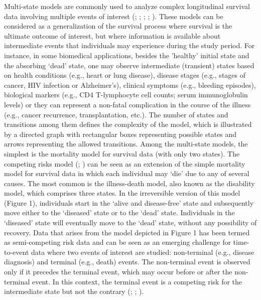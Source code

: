 Multi-state models are commonly used to analyze complex longitudinal survival data involving multiple events of interest (\citealp{Andersen1993}; \citealp{Hougaard2000}; \citealp{Putter2007}; \citealp{MM2009}; \citealp{LFMM2019}). These models can be considered as a generalization of the survival process where survival is the ultimate outcome of interest, but where information is available about intermediate events that individuals may experience during the study period. For instance, in some biomedical applications, besides the 'healthy' initial state and the absorbing `dead' state, one may observe intermediate (transient) states based on health conditions (e.g., heart or lung disease), disease stages (e.g., stages of cancer, HIV infection or Alzheimer's), clinical symptoms (e.g., bleeding episodes), biological markers (e.g., CD4 T-lymphocyte cell counts; serum immunoglobulin levels) or they can represent a non-fatal complication in the course of the illness (e.g., cancer recurrence, transplantation, etc.). The number of states and transitions among them defines the complexity of the model, which is illustrated by a directed graph with rectangular boxes representing possible states and arrows representing the allowed transitions. Among the multi-state models, the simplest is the mortality model for survival data (with only two states). The competing risks model (\citealp{Andersen2002}; \citealp{Putter2007}) can be seen as an extension of the simple mortality model for survival data in which each individual may `die' due to any of several causes. The most common is the illness-death model, also known as the disability model, which comprises three states. In the irreversible version of this model (Figure 1), individuals start in the `alive and disease-free' state and subsequently move either to the `diseased' state or to the `dead' state. Individuals in the `diseased' state will eventually move to the `dead' state, without any possibility of recovery. Data that arises from the model depicted in Figure 1 has been termed as semi-competing risk data and can be seen as an emerging challenge for time-to-event data where two events of interest are studied: non-terminal (e.g., disease diagnosis) and terminal (e.g., death) events. The non-terminal event is observed only if it precedes the terminal event, which may occur before or after the non-terminal event. In this context, the terminal event is a competing risk for the intermediate state but not the contrary (\citealp{Xu2010}; \citealp{Li2017}; \citealp{Nevo2020}).


